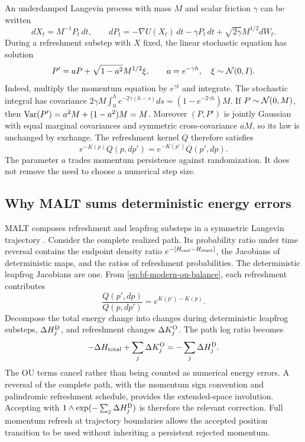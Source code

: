 An underdamped Langevin process with mass $M$ and scalar friction $\gamma$
can be written
\begin{equation}
 dX_t=M^{-1}P_t\,dt,\qquad
 dP_t=-\nabla U(X_t)\,dt-\gamma P_t\,dt
          +\sqrt{2\gamma}M^{1/2}dW_t.
 \label{eq:bf-modern-langevin}
\end{equation}
During a refreshment substep with $X$ fixed, the linear stochastic equation
has solution
\begin{equation}
 P'=aP+\sqrt{1-a^2}M^{1/2}\xi,\qquad
 a=e^{-\gamma h},\quad\xi\sim\mathcal{N}(0,I).
 \label{eq:bf-modern-ou}
\end{equation}
Indeed, multiply the momentum equation by $e^{\gamma t}$ and integrate.
The stochastic integral has covariance
$2\gamma M\int_0^h e^{-2\gamma(h-s)}ds=(1-e^{-2\gamma h})M$.
If $P\sim\mathcal{N}(0,M)$, then $\operatorname{Var}(P')=a^2M+(1-a^2)M=M$. Moreover
$(P,P')$ is jointly Gaussian with equal marginal covariances and symmetric
cross-covariance $aM$, so its law is unchanged by exchange. The refreshment
kernel $Q$ therefore satisfies
\begin{equation}
 e^{-K(p)}Q(p,dp')=e^{-K(p')}Q(p',dp).
 \label{eq:bf-modern-ou-balance}
\end{equation}
The parameter $a$ trades momentum persistence against randomization. It does
not remove the need to choose a numerical step size.

\subsection{Why MALT sums deterministic energy errors}

MALT composes refreshment and leapfrog substeps in a symmetric Langevin
trajectory \citep[Sections 2--3]{rioudurand2023malt}. Consider the complete
realized path. Its probability ratio under time reversal contains the
endpoint density ratio $e^{-[H_{\rm end}-H_{\rm start}]}$, the Jacobians
of deterministic maps, and the ratios of refreshment probabilities. The
deterministic leapfrog Jacobians are one. From
\eqref{eq:bf-modern-ou-balance}, each refreshment contributes
\begin{equation}
 \frac{Q(p',dp)}{Q(p,dp')}=e^{K(p')-K(p)}.
 \label{eq:bf-modern-refresh-ratio}
\end{equation}
Decompose the total energy change into changes during deterministic
leapfrog substeps, $\Delta H_j^{\rm D}$, and refreshment changes
$\Delta K_j^{\rm O}$. The path log ratio becomes
\begin{equation}
 -\Delta H_{\rm total}+\sum_j\Delta K_j^{\rm O}
       =-\sum_j\Delta H_j^{\rm D}.
 \label{eq:bf-modern-malt-path-ratio}
\end{equation}
The OU terms cancel rather than being counted as numerical energy errors.
A reversal of the complete path, with the momentum sign convention and
palindromic refreshment schedule, provides the extended-space involution.
Accepting with $1\wedge\exp(-\sum_j\Delta H_j^{\rm D})$ is therefore
the relevant correction. Full momentum refresh at trajectory boundaries
allows the accepted position transition to be used without inheriting a
persistent rejected momentum.

